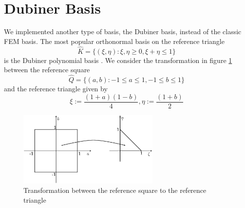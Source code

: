 \documentclass[a4paper,12pt]{article}
\begin{document}
\section{Dubiner Basis}
We implemented another type of basis, the Dubiner basis, instead of the classic FEM basis.
    The most popular orthonormal basis on the reference triangle
    \begin{equation}
    \hat{K}=\{ (\xi, \eta) : \xi, \eta \ge 0,	\xi+\eta \le 1 \}
    \end{equation}
    is the Dubiner polynomial basis \cite{antonietti}. We consider the transformation in figure \ref{transformation} between the reference square
    \begin{equation}
    \hat{Q}=\{ (a, b) : -1 \le a \le 1, -1 \le b \le 1 \}
    \end{equation}
    and the reference triangle given by
    \begin{equation}
    \xi:=\frac{(1+a)(1-b)}{4},  \eta:=\frac{(1+b)}{2}
    \end{equation}
    
    \begin{figure}[h]
    \begin{center}
    \includegraphics[width = 7cm]{./transformation.png}
    	\caption{Transformation between the reference square to the reference triangle}
    	\label{transformation}
    \end{center}
    \end{figure}
    
\end{document}
